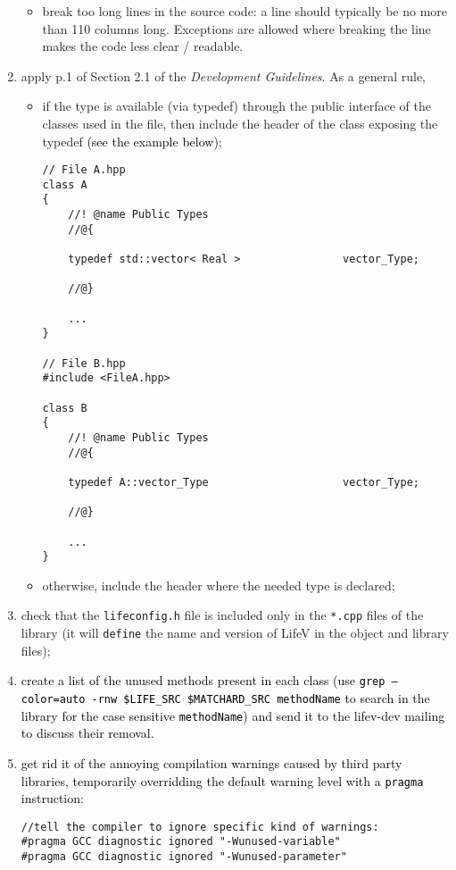 \documentclass[10p]{article}
\newcommand{\newparts}[1]{\textcolor{black}{#1}}
\newcommand{\newpartsVC}[1]{\textcolor{black}{#1}}
\theoremstyle{definition}
\begin{document}
\begin{enumerate}
\begin{itemize}
	  \item break too long lines in the source code: a line should typically be no more than 110 columns long.
	  Exceptions are allowed where breaking the line makes the code less clear / readable.
  \end{itemize}
  \item apply p.1 of Section 2.1 of the \emph{Development Guidelines}. As a general rule,
    \begin{itemize}
	\item if the type is available (via typedef) through the public interface of the classes used in the file, then
  include the header of the class exposing the typedef \newparts{(see the example below)};
\begin{lstlisting}
// File A.hpp
class A
{
    //! @name Public Types
    //@{

    typedef std::vector< Real >                vector_Type;

    //@}
    
    ...
}

// File B.hpp
#include <FileA.hpp>

class B
{
    //! @name Public Types
    //@{

    typedef A::vector_Type                     vector_Type;

    //@}
    
    ...
}
\end{lstlisting}
	\item otherwise, include the header where the needed type is declared;
	\end{itemize}
  \item check that the \texttt{lifeconfig.h} file is included only in the \texttt{*.cpp} files of the library (it will \texttt{define} the name and version of LifeV in the object and library files);
  \item \newpartsVC{create a list of the unused methods present in each class (use \texttt{grep --color=auto -rnw \$LIFE\_SRC \$MATCHARD\_SRC methodName} to search in the library for the case sensitive \texttt{methodName}) and send it to the lifev-dev mailing to discuss their removal.}
  \item \newpartsVC{get rid it of the annoying compilation warnings caused by third party libraries, temporarily overridding the default warning level with a \texttt{pragma} instruction}:
\begin{lstlisting}
//tell the compiler to ignore specific kind of warnings:
#pragma GCC diagnostic ignored "-Wunused-variable"
#pragma GCC diagnostic ignored "-Wunused-parameter"


\end{lstlisting}
\end{enumerate}
\end{document}
